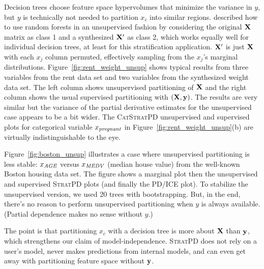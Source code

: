 \documentclass[12pt]{article}
\newcommand{\figref}[1]{Figure~\ref{#1}}
\newcommand{\spd}{\fontfamily{cmr}\textsc{\small StratPD}}
\newcommand{\cspd}{\fontfamily{cmr}\textsc{\small CatStratPD}}
\newcommand{\xnc}{$x_{\overline{c}}$}
\begin{document}
Decision trees choose feature space hypervolumes that minimize the variance in $y$, but $y$ is technically not needed to partition \xnc{} into similar regions. \cite{RFunsup} described how to use random forests in an unsupervised fashion by considering the original $\bf X$ matrix as class 1 and a synthesized $\bf X'$ as class 2, which works equally well for individual decision trees, at least for this stratification application. $\bf X'$ is just $\bf X$ with each $x_j$ column permuted, effectively sampling from the $x_j$'s marginal distributions. \figref{fig:rent_weight_unsup} shows typical results from three variables from the rent data set and two variables from the synthesized weight data set.  The left column shows unsupervised partitioning of $\bf X$ and the right column shows the usual supervised partitioning with $(\bf X, y)$. The results are very similar but the variance of the partial derivative estimates for the unsupervised case appears to be a bit wider. The \cspd{} unsupervised and supervised plots for categorical variable $x_{\it pregnant}$ in \figref{fig:rent_weight_unsup}(b) are virtually indistinguishable to the eye. 

\figref{fig:boston_unsup} illustrates a case where unsupervised partitioning is less stable: $x_{\it AGE}$ versus $x_{\it MEDV}$ (median house value) from the well-known Boston housing data set. The figure shows a marginal plot then the unsupervised and supervised \spd{} plots (and finally the PD/ICE plot). To stabilize the unsupervised version, we used 20 trees with bootstrapping. But, in the end, there's no reason to perform unsupervised partitioning when $y$ is always available. (Partial dependence makes no sense without $y$.) 

The point is that partitioning \xnc{}  with a decision tree is more about $\bf X$ than $\bf y$, which strengthens our claim of model-independence. \spd{} does not rely on a user's model, never makes predictions from internal models, and can even get away with partitioning feature space without $\bf y$.
\end{document}
